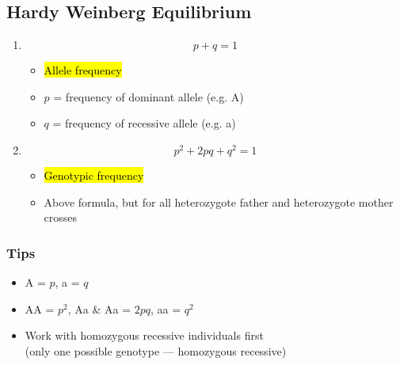 \documentclass[a4paper,12pt]{article}
\begin{document}
\subsection{Hardy Weinberg Equilibrium}\noindent

\begin{enumerate}
    \item{
            \Huge $$p + q = 1$$ \normalsize
            \begin{itemize}
                \item{\hl{Allele frequency}}
                \item{$p$ = frequency of dominant allele (e.g. A)}
                \item{$q$ = frequency of recessive allele (e.g. a)}
            \end{itemize}
        }
    \item{
            \Huge $$p^2 + 2pq + q^2 = 1$$ \normalsize
            \begin{itemize}
                \item{\hl{Genotypic frequency}}
                \item{Above formula, but for all heterozygote father and heterozygote mother crosses}
            \end{itemize}
        }
\end{enumerate}

\subsubsection{Tips}
\begin{itemize}
    \item{A = $p$, a = $q$}
    \item{AA = $p^2$, Aa \& Aa = $2pq$, aa = $q^2$}
    \item{Work with homozygous recessive individuals first \\ (only one possible genotype --- homozygous recessive)}

\end{itemize}
\end{document}
